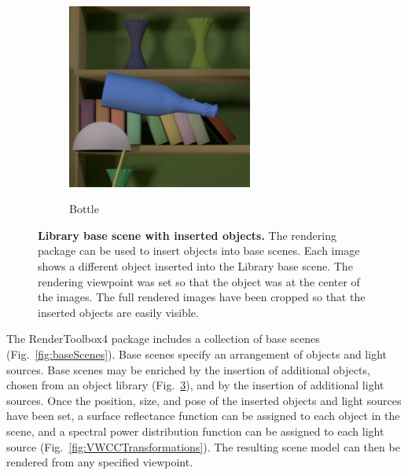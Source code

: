 \documentclass{jov}
\begin{document}
\begin{figure}
\begin{subfigure}[b]{0.14 \textwidth}
        \label{fig:libraryWithRingToy}
    \end{subfigure}
        ~
    	\begin{subfigure}[b]{0.14 \textwidth}
        \caption{Bottle}
        \includegraphics[width=\textwidth]{../FiguresDraft5/Figure3/Figure3_e.png}
        \label{fig:libraryWithChampagneBottle}
    \end{subfigure}
\caption{{\bf Library base scene with inserted objects.} The rendering package can be used to insert objects into base scenes. Each image shows a different object inserted into the Library base scene. The rendering viewpoint was set so that the object was at the center of the images. The full rendered images have been cropped so that the inserted objects are easily visible.}\label{fig:libraryWithTarget}
\end{figure}

The RenderToolbox4 package includes a collection of base scenes (Fig.~\ref{fig:baseScenes}).
Base scenes specify an arrangement of objects and light sources.
Base scenes may be enriched by the insertion of additional objects, chosen from an object library (Fig.~\ref{fig:libraryWithTarget}), and by the insertion of additional light sources.
Once the position, size, and pose of the inserted objects and light sources have been set, 
a surface reflectance function can be assigned to each object in the scene, and a spectral power distribution function can be assigned to each light source (Fig.~\ref{fig:VWCCTransformations}). The resulting scene model can then be rendered from any specified viewpoint.
\end{document}
